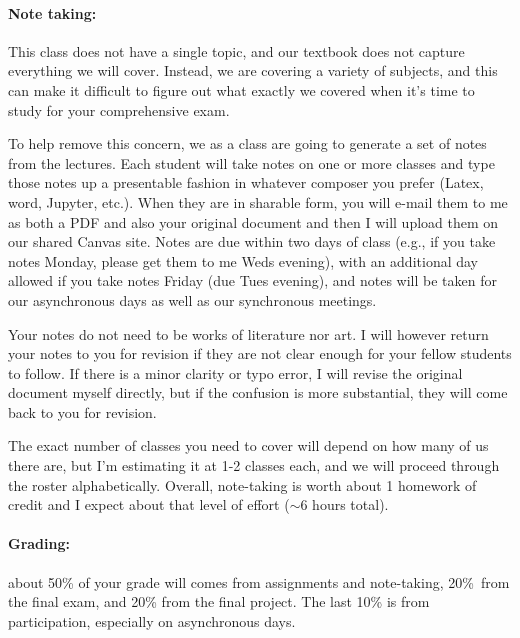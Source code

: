 \documentclass[12pt, preprint]{aastex}
\begin{document}
\paragraph{Note taking:}
This class does not have a single topic, and our textbook does not capture everything we will cover.  Instead, we are covering a variety of subjects, and this can make it difficult to figure out what exactly we covered when it’s time to study for your comprehensive exam.

To help remove this concern, we as a class are going to generate a set of notes from the lectures. Each student will take notes on one or more classes and type those notes up a presentable fashion in whatever composer you prefer (Latex, word, Jupyter, etc.).  When they are in sharable form, you will e-mail them to me as both a PDF and also your original document and then I will upload them on our shared Canvas site.  Notes are due within two days of class (e.g., if you take notes Monday, please get them to me Weds evening), with an additional day allowed if you take notes Friday (due Tues evening), and notes will be taken for our asynchronous days as well as our synchronous meetings.

Your notes do not need to be works of literature nor art.  I will however return your notes to you for revision if they are not clear enough for your fellow students to follow.  If there is a minor clarity or typo error, I will revise the original document myself directly, but if the confusion is more substantial, they will come back to you for revision.

The exact number of classes you need to cover will depend on how many of us there are, but I’m estimating it at 1-2 classes each, and we will proceed through the roster alphabetically.  Overall, note-taking is worth about 1 homework of credit and I expect about that level of effort ($\sim 6$ hours total).

\paragraph{Grading:} about 50\% of your grade will comes from
assignments and note-taking, 20\%~from the final exam, and 20\% from the final project.  The last 10\% is from participation, especially on asynchronous days.
\end{document}
